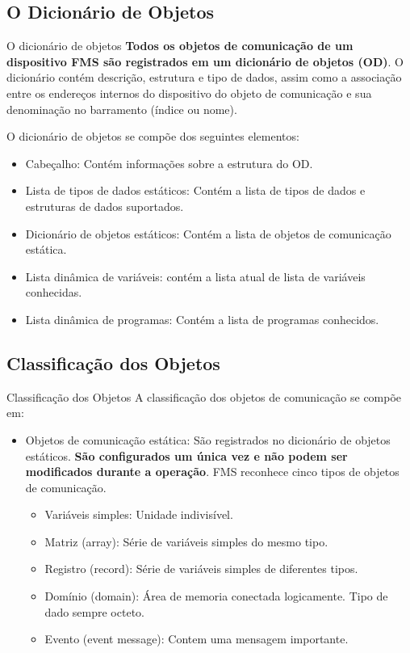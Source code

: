 \documentclass{beamer}
\begin{document}
\subsection{O Dicionário de Objetos}
\begin{frame}{O dicionário de objetos}
\textbf{Todos os objetos de comunicação de um dispositivo FMS são registrados em um dicionário de objetos (OD)}. O dicionário contém descrição, estrutura e tipo de dados, assim como a associação entre os endereços internos do dispositivo do objeto de comunicação e sua denominação no barramento (índice ou nome).

O dicionário de objetos se compõe dos seguintes elementos:
\begin{itemize}
\item Cabeçalho: Contém informações sobre a estrutura do OD. 
\item Lista de tipos de dados estáticos: Contém a lista de tipos de dados e estruturas de dados suportados. 
\item Dicionário de objetos estáticos: Contém a lista de objetos de comunicação estática. 
\item Lista dinâmica de variáveis: contém a lista atual de lista de variáveis conhecidas. 
\item Lista dinâmica de programas: Contém a lista de programas conhecidos.
\end{itemize}

\end{frame}

\subsection{Classificação dos Objetos}
\begin{frame}{Classificação dos Objetos}
A classificação dos objetos de comunicação se compõe em:
\begin{itemize}
\item Objetos de comunicação estática: São registrados no dicionário de objetos estáticos. \textbf{São configurados um única vez e não podem ser modificados durante a operação}. FMS reconhece cinco tipos de objetos de comunicação.
\begin{itemize}
\item Variáveis simples: Unidade indivisível.
\item Matriz (array): Série de variáveis simples do mesmo tipo.
\item Registro (record): Série de variáveis simples de diferentes tipos.
\item Domínio (domain): Área de memoria conectada logicamente. Tipo de dado sempre octeto.
\item Evento (event message): Contem uma mensagem importante.
\end{itemize}
\end{itemize}
\end{frame}
\end{document}
